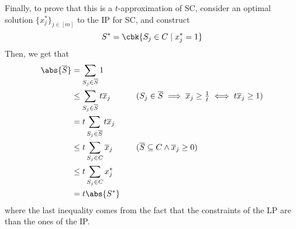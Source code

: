 \documentclass[a4paper, 12pt]{report}
\begin{document}
{        Finally, to prove that this is a $t$-approximation of SC, consider an optimal solution $\{x^*_j\}_{j \in [m]}$ to the IP for SC, and construct $$S^* = \cbk{S_j \in C \mid x_j^* = 1}$$ Then, we get that
        \begin{equation*}
            \begin{alignedat}{2}
                \abs{\overline S} &= \sum_{S_j \in \overline S}{1} && \\
                                  &\le \sum_{S_j \in \overline S}{t \overline x_j} && \quad \quad (S_j \in \overline S \implies \overline x_j \ge \tfrac{1}{t} \iff t \overline x_j \ge 1) \\
                                  &= t \sum_{S_j \in \overline S}{t \overline x_j} && \\
                                  &\le t \sum_{S_j \in C}{\overline x_j} && \quad \quad (\overline S \subseteq C \land \overline x_j \ge 0) \\
                                  &\le t \sum_{S_j \in C}{x^*_j} \\
                                  &= t \abs{S^*}
            \end{alignedat}
        \end{equation*}
        where the last inequality comes from the fact that the constraints of the LP are  than the ones of the IP.
    }

    \printbibliography %
\end{document}
